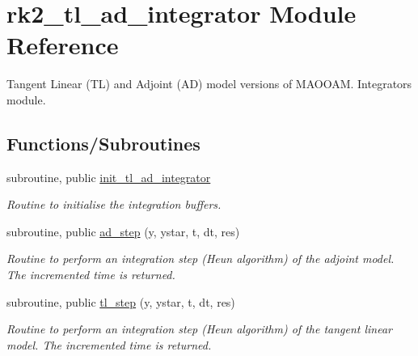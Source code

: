 \hypertarget{namespacerk2__tl__ad__integrator}{}\section{rk2\+\_\+tl\+\_\+ad\+\_\+integrator Module Reference}
\label{namespacerk2__tl__ad__integrator}


Tangent Linear (TL) and Adjoint (AD) model versions of M\+A\+O\+O\+AM. Integrators module.  


\subsection*{Functions/\+Subroutines}
\begin{DoxyCompactItemize}
\item 
subroutine, public \hyperlink{namespacerk2__tl__ad__integrator_a6fc4fb602b29384a3e7323e73d6cc123}{init\+\_\+tl\+\_\+ad\+\_\+integrator}
\begin{DoxyCompactList}\small\item\em Routine to initialise the integration buffers. \end{DoxyCompactList}\item 
subroutine, public \hyperlink{namespacerk2__tl__ad__integrator_a2f42368825b617949c823d8bac3cac81}{ad\+\_\+step} (y, ystar, t, dt, res)
\begin{DoxyCompactList}\small\item\em Routine to perform an integration step (Heun algorithm) of the adjoint model. The incremented time is returned. \end{DoxyCompactList}\item 
subroutine, public \hyperlink{namespacerk2__tl__ad__integrator_a47f17f39dfcac4d00f93bf4f8b3b3d0a}{tl\+\_\+step} (y, ystar, t, dt, res)
\begin{DoxyCompactList}\small\item\em Routine to perform an integration step (Heun algorithm) of the tangent linear model. The incremented time is returned. \end{DoxyCompactList}\end{DoxyCompactItemize}
